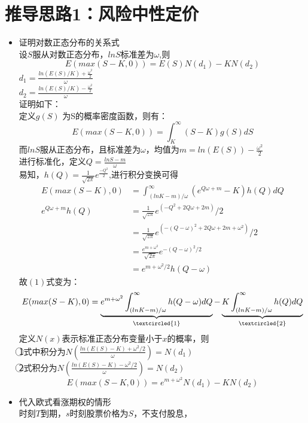 \documentclass{article}
\begin{document}
\section{推导思路1：风险中性定价}
\begin{itemize}
	\item 证明对数正态分布的关系式\\
	设$ S $服从对数正态分布，$lnS$标准差为$\omega$,则\\
	\[ E(max(S-K,0)) = E(S)N(d_{1})-KN(d_{2}) \] 
	$ d_{1} = \frac{ln(E(S)/K) + \frac{\omega^2}{2}}{\omega} $\\
	$ d_{2} = \frac{ln(E(S)/K) - \frac{\omega^2}{2}}{\omega} $\\
	证明如下：\\
	定义$ g(S) $ 为S的概率密度函数，则有：
	\[E(max(S-K,0)) = \int_{K}^{\infty}(S-K)g(S)dS\] 
	而$lnS$服从正态分布，且标准差为$ \omega $，均值为$ m = ln(E(S)) - \frac{\omega^2}{2} $\\
	进行标准化，定义$ Q = \frac{lnS - m}{\omega} $\\
	易知，$ h(Q) = \frac{1}{\sqrt{2\pi}} e^\frac{- Q^2}{2}$,进行积分变换可得\\
	\begin{align}
	 E(max(S-K),0) 
	 & = \int_{(lnK-m)/\omega}^{\infty}(e^{Q\omega+m} - K) h(Q)dQ\\
	 \nonumber e^{Q\omega+m}h(Q) 
	 & = \frac{1}{\sqrt{z\pi}}e^{(-Q^2+2Q\omega+2m)}/2 \\
	\nonumber & = \frac{1}{\sqrt{z\pi}}e^{(-(Q - \omega)^2+2Q\omega+2m+\omega^2)}/2\\
	\nonumber & = \frac{e^{m+\omega^2}}{\sqrt{2\pi}}e^{-(Q-\omega)^2/2}\\
	\nonumber & = e^{m+\omega^2/2}h(Q-\omega)
	\end{align}
	故$ (1) $式变为：\\
	\[E(max(S-K),0) 
	=\underbrace{e^{m+\omega^2}\int_{(lnK-m)/\omega}^{\infty}
	h(Q-\omega)dQ}_{\textcircled{1}} 
	-\underbrace{K\int_{(lnK-m)/\omega}^{\infty}h(Q)dQ}_{\textcircled{2}}\]
	定义$ N(x) $表示标准正态分布变量小于$ x $的概率，则\\
	\textcircled{1}式中积分为$ N(\frac{ln(E(S)-K)+\omega^2/2}{\omega})=N(d_{1}) $\\
	\textcircled{2}式积分为$ N(\frac{ln(E(S)-K)-\omega^2/2}{\omega})=N(d_{2}) $\\
	\[ E(max(S-K,0)) = e^{m+\omega^2}N(d_{1})-KN(d_{2}) \] 
	\item 代入欧式看涨期权的情形\\
	时刻$ T$到期，$s$时刻股票价格为$S$，不支付股息，

\end{itemize}
\end{document}
